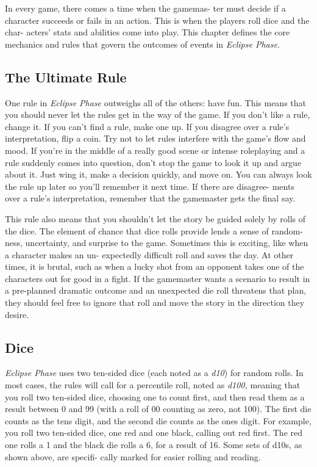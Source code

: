 In every game, there comes a time when the gamemas-
ter must decide if a character succeeds or fails in an 
action. This is when the players roll dice and the char-
acters' stats and abilities come into play. This chapter 
defines the core mechanics and rules that govern the 
outcomes of events in \textit{Eclipse Phase}.

\subsection{The Ultimate Rule}

One rule in \textit{Eclipse Phase} outweighs all of the others: 
have fun. This means that you should never let the 
rules get in the way of the game. If you don't like a 
rule, change it. If you can't find a rule, make one up. 
If you disagree over a rule's interpretation, flip a coin. 
Try not to let rules interfere with the game's flow and 
mood. If you're in the middle of a really good scene 
or intense roleplaying and a rule suddenly comes into 
question, don't stop the game to look it up and argue 
about it. Just wing it, make a decision quickly, and 
move on. You can always look the rule up later so 
you'll remember it next time. If there are disagree-
ments over a rule's interpretation, remember that the 
gamemaster gets the final say.

This rule also means that you shouldn't let the story 
be guided solely by rolls of the dice. The element of 
chance that dice rolls provide lends a sense of random-
ness, uncertainty, and surprise to the game. Sometimes 
this is exciting, like when a character makes an un-
expectedly difficult roll and saves the day. At other 
times, it is brutal, such as when a lucky shot from an 
opponent takes one of the characters out for good in a 
fight. If the gamemaster wants a scenario to result in a 
pre-planned dramatic outcome and an unexpected die 
roll threatens that plan, they should feel free to ignore 
that roll and move the story in the direction they desire.

\subsection{Dice}

\textit{Eclipse Phase} uses two ten-sided dice (each noted as 
a \textit{d10}) for random rolls. In most cases, the rules will 
call for a percentile roll, noted as \textit{d100,} meaning that 
you roll two ten-sided dice, choosing one to count first, 
and then read them as a result between 0 and 99 (with 
a roll of 00 counting as zero, not 100). The first die 
counts as the tens digit, and the second die counts as 
the ones digit. For example, you roll two ten-sided 
dice, one red and one black, calling out red first. The 
red one rolls a 1 and the black die rolls a 6, for a result 
of 16. Some sets of d10s, as shown above, are specifi-
cally marked for easier rolling and reading.

